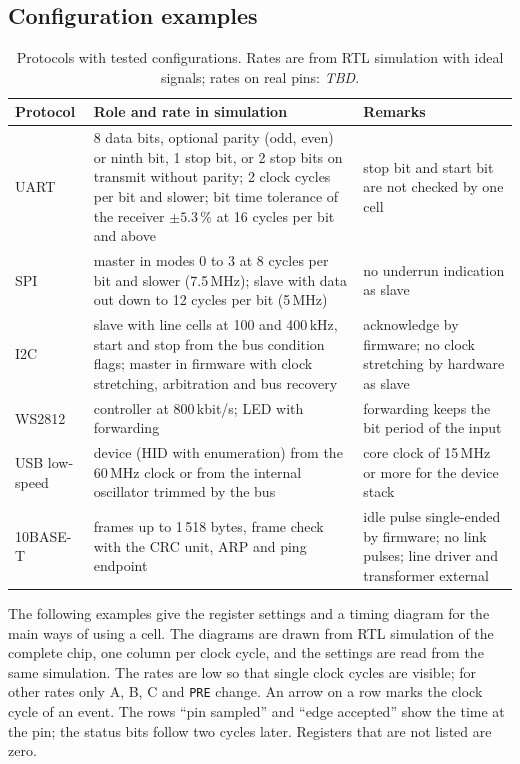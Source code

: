 \documentclass[10pt,a4paper]{article}
\newcommand{\reg}[1]{\texttt{#1}}
\newcommand{\tbd}{\textcolor{black!50}{\textit{TBD}}}
\begin{document}
\subsection{Configuration examples}

\begin{table}[H]
\centering\small
\begin{tabularx}{\linewidth}{@{}lLL@{}}
\toprule
Protocol & Role and rate in simulation & Remarks \\
\midrule
UART & 8 data bits, optional parity (odd, even) or ninth bit, 1 stop bit, or 2 stop bits on transmit without parity; 2 clock cycles per bit and slower; bit time tolerance of the receiver $\pm 5.3\,\%$ at 16 cycles per bit and above & stop bit and start bit are not checked by one cell\\
SPI & master in modes 0 to 3 at 8 cycles per bit and slower (7.5\,MHz); slave with data out down to 12 cycles per bit (5\,MHz) & no underrun indication as slave \\
I2C & slave with line cells at 100 and 400\,kHz, start and stop from the bus condition flags; master in firmware with clock stretching, arbitration and bus recovery & acknowledge by firmware; no clock stretching by hardware as slave \\
WS2812 & controller at 800\,kbit/s; LED with forwarding & forwarding keeps the bit period of the input \\
USB low-speed & device (HID with enumeration) from the 60\,MHz clock or from the internal oscillator trimmed by the bus & core clock of 15\,MHz or more for the device stack \\
10BASE-T & frames up to 1\,518 bytes, frame check with the CRC unit, ARP and ping endpoint & idle pulse single-ended by firmware; no link pulses; line driver and transformer external \\
\bottomrule
\end{tabularx}
\caption{Protocols with tested configurations. Rates are from RTL simulation with ideal signals; rates on
real pins: \tbd.}
\end{table}

The following examples give the register settings and a timing diagram for the main ways of using a cell. The
diagrams are drawn from RTL simulation of the complete chip, one column per clock cycle, and the settings are
read from the same simulation. The rates are low so that single clock cycles are visible; for other rates only
A, B, C and \reg{PRE} change. An arrow on a row marks the clock cycle of an event. The rows ``pin sampled'' and
``edge accepted'' show the time at the pin; the status bits follow two cycles later. Registers that are not
listed are zero.
\end{document}

